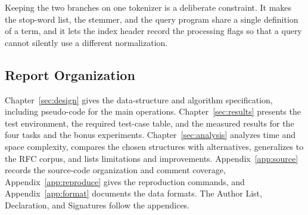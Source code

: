 Keeping the two branches on one tokenizer is a deliberate constraint. It makes
the stop-word list, the stemmer, and the query program share a single
definition of a term, and it lets the index header record the processing flags
so that a query cannot silently use a different normalization.

\subsection{Report Organization}

Chapter~\ref{sec:design} gives the data-structure and algorithm specification,
including pseudo-code for the main operations. Chapter~\ref{sec:results}
presents the test environment, the required test-case table, and the measured
results for the four tasks and the bonus experiments.
Chapter~\ref{sec:analysis} analyzes time and space complexity, compares the
chosen structures with alternatives, generalizes to the RFC corpus, and lists
limitations and improvements. Appendix~\ref{app:source} records the source-code
organization and comment coverage, Appendix~\ref{app:reproduce} gives the
reproduction commands, and Appendix~\ref{app:format} documents the data
formats. The Author List, Declaration, and Signatures follow the appendices.

